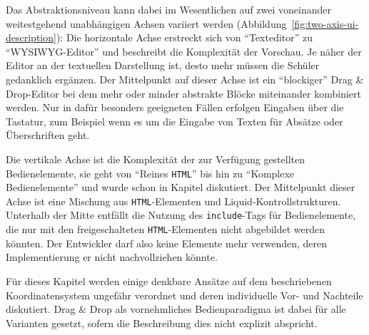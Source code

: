 Das Abstraktionsniveau kann dabei im Wesentlichen auf zwei voneinander weitestgehend unabhängigen Achsen variiert werden (Abbildung~\ref{fig:two-axis-ui-description}): Die horizontale Achse erstreckt sich von "`Texteditor"' zu "`WYSIWYG-Editor"' und beschreibt die Komplexität der Vorschau. Je näher der Editor an der textuellen Darstellung ist, desto mehr müssen die Schüler gedanklich ergänzen. Der Mittelpunkt auf dieser Achse ist ein "`blockiger"' Drag \& Drop-Editor bei dem mehr oder minder abstrakte Blöcke miteinander kombiniert werden. Nur in dafür besonders geeigneten Fällen erfolgen Eingaben über die Tastatur, zum Beispiel wenn es um die Eingabe von Texten für Absätze oder Überschriften geht.

Die vertikale Achse ist die Komplexität der zur Verfügung gestellten Bedienelemente, sie geht von "`Reines \texttt{HTML}"' bis hin zu "`Komplexe Bedienelemente"' und wurde schon in Kapitel  diskutiert. Der Mittelpunkt dieser Achse ist eine Mischung aus \texttt{HTML}-Elementen und Liquid-Kontrollstrukturen. Unterhalb der Mitte entfällt die Nutzung des \texttt{include}-Tags für Bedienelemente, die nur mit den freigeschalteten \texttt{HTML}-Elementen nicht abgebildet werden könnten. Der Entwickler darf also keine Elemente mehr verwenden, deren Implementierung er nicht nachvollziehen könnte.

Für dieses Kapitel werden einige denkbare Ansätze auf dem beschriebenen Koordinatensystem ungefähr verordnet und deren individuelle Vor- und Nachteile diskutiert. Drag \& Drop als vornehmliches Bedienparadigma ist dabei für alle Varianten gesetzt, sofern die Beschreibung dies nicht explizit abspricht.


